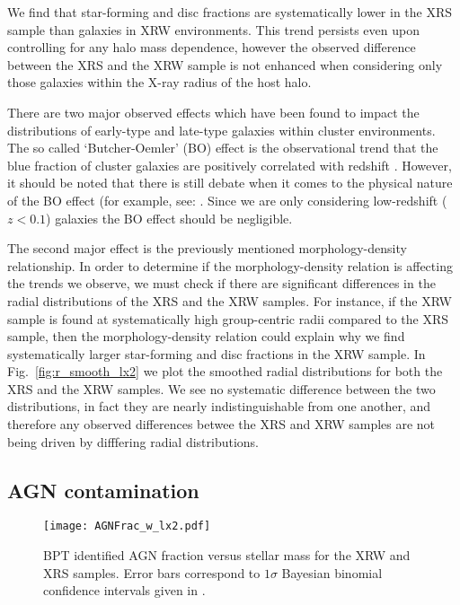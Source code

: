 We find that star-forming and disc fractions are systematically lower
in the XRS sample than galaxies in XRW environments.  This trend
persists even upon controlling for any halo mass dependence, however
the observed difference between the XRS and the XRW sample is not
enhanced when considering only those galaxies within the X-ray radius
of the host halo.
\par
There are two major observed effects which have been found to impact
the distributions of early-type and late-type galaxies within cluster
environments.  The so called `Butcher-Oemler' (BO) effect is the
observational trend that the blue fraction of cluster galaxies are
positively correlated with redshift \citep[e.g.][]{butcher1984,
  ellingson2001, loh2008, urquhart2010}.  However, it should be noted
that there is still debate when it comes to the physical nature of the
BO effect (for example, see: \citealt{andreon1999, andreon2004,
  andreon2006}.  Since we are only considering low-redshift ($z <
0.1$) galaxies the BO effect should be negligible.
\par
The second major effect is the previously mentioned morphology-density
relationship.  In order to determine if the morphology-density
relation is affecting the trends we observe, we must check if there
are significant differences in the radial distributions of the XRS and
the XRW samples.  For instance, if the XRW sample is found at
systematically high group-centric radii compared to the XRS sample,
then the morphology-density relation could explain why we find
systematically larger star-forming and disc fractions in the XRW
sample.  In Fig.~\ref{fig:r_smooth_lx2} we plot the smoothed radial
distributions for both the XRS and the XRW samples.  We see no
systematic difference between the two distributions, in fact they are
nearly indistinguishable from one another, and therefore any observed
differences betwee the XRS and XRW samples are not being driven by
difffering radial distributions.

\subsection{AGN contamination}

\begin{figure}[!tp]
  \centering
  \texttt{[image: AGNFrac\_w\_lx2.pdf]}
  \caption{BPT identified AGN fraction versus stellar mass for the XRW
  and XRS samples.  Error bars correspond to $1\sigma$ Bayesian
  binomial confidence intervals given in \citet{cameron2011}.}
  \label{fig:AGNFrac_w_lx2}
\end{figure}

